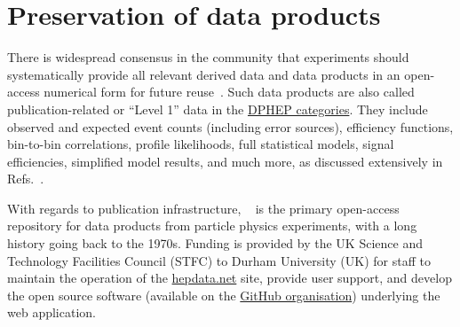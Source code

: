 \documentclass[11pt]{article}
\begin{document}
\section{Preservation of data products}
\label{data-products}

There is widespread consensus in the community that experiments should systematically provide all relevant derived data and \glspl{data product} in an open-access numerical form for future reuse~\cite{LHCReinterpretationForum:2020xtr}. 
Such \glspl{data product} are also called publication-related or ``Level 1'' data in the 
\href{https://opendata.cern.ch/docs/about}{DPHEP categories}. 
They include observed and expected event counts  (including error sources), efficiency functions,  bin-to-bin correlations, profile likelihoods, full statistical models, signal efficiencies, simplified model results, and much more, 
as discussed extensively in Refs.~\cite{LHCReinterpretationForum:2020xtr,Cranmer:2021urp}.

With regards to publication infrastructure, 
\hepdata~\cite{hepdata} is the primary open-access repository for %
data products from particle physics experiments, with a long history going back to the 1970s.
Funding is provided by the UK Science and Technology Facilities Council (STFC) to Durham University (UK) for staff to maintain the operation of the \href{https://www.hepdata.net/}{hepdata.net} site, provide user support, and develop the open source software (available on the \href{https://github.com/HEPData}{\hepdata GitHub organisation}) underlying the web application.
\end{document}
